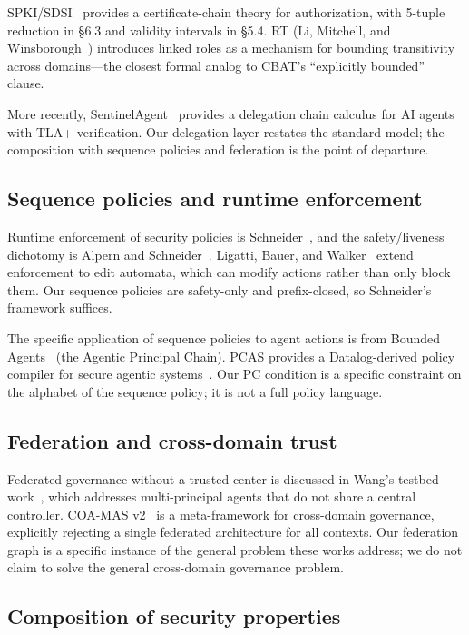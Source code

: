 \documentclass[11pt,a4paper]{article}
\theoremstyle{plain}
\theoremstyle{definition}
\theoremstyle{remark}
\begin{document}
SPKI/SDSI~\cite{rfc2693spki} provides a certificate-chain theory for
authorization, with 5-tuple reduction in \S6.3 and validity intervals in
\S5.4. RT (Li, Mitchell, and Winsborough~\cite{rt2002}) introduces linked roles
as a mechanism for bounding transitivity across domains---the closest formal
analog to CBAT's ``explicitly bounded'' clause.

More recently, SentinelAgent~\cite{sentinelagent2026} provides a delegation
chain calculus for AI agents with TLA+ verification. Our delegation layer
restates the standard model; the composition with sequence policies and
federation is the point of departure.

\subsection{Sequence policies and runtime enforcement}

Runtime enforcement of security policies is
Schneider~\cite{schneider2000enforceable}, and the safety/liveness dichotomy
is Alpern and Schneider~\cite{alpern1985defining}. Ligatti, Bauer, and
Walker~\cite{ligatti2005edit} extend enforcement to edit automata, which can
modify actions rather than only block them. Our sequence policies are
safety-only and prefix-closed, so Schneider's framework suffices.

The specific application of sequence policies to agent actions is from
Bounded Agents~\cite{boundedagents2026} (the Agentic Principal Chain). PCAS
provides a Datalog-derived policy compiler for secure agentic
systems~\cite{pacs2026}. Our PC condition is a specific constraint on the
alphabet of the sequence policy; it is not a full policy language.

\subsection{Federation and cross-domain trust}

Federated governance without a trusted center is discussed in Wang's testbed
work~\cite{wang2026federated}, which addresses multi-principal agents that do
not share a central controller. COA-MAS v2~\cite{coamas2026} is a
meta-framework for cross-domain governance, explicitly rejecting a single
federated architecture for all contexts. Our federation graph is a
specific instance of the general problem these works address; we do not
claim to solve the general cross-domain governance problem.

\subsection{Composition of security properties}
\end{document}
